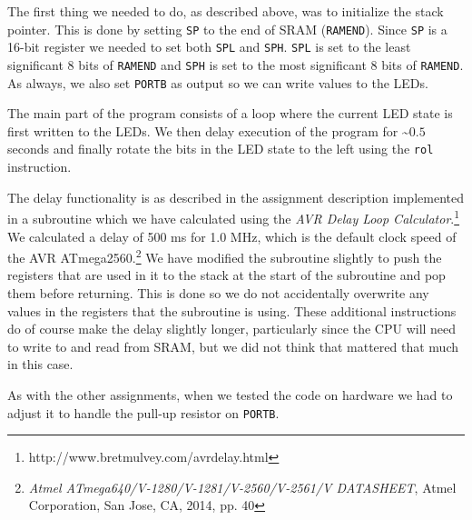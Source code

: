 The first thing we needed to do, as described above, was to initialize the stack pointer. This is done by setting \texttt{SP} to the end of SRAM (\texttt{RAMEND}). Since \texttt{SP} is a 16-bit register we needed to set both \texttt{SPL} and \texttt{SPH}. \texttt{SPL} is set to the least significant 8 bits of \texttt{RAMEND} and \texttt{SPH} is set to the most significant 8 bits of \texttt{RAMEND}. As always, we also set \texttt{PORTB} as output so we can write values to the LEDs.

The main part of the program consists of a loop where the current LED state is first written to the LEDs. We then delay execution of the program for \textasciitilde $0.5$ seconds and finally rotate the bits in the LED state to the left using the \texttt{rol} instruction. 

The delay functionality is as described in the assignment description implemented in a subroutine which we have calculated using the \emph{AVR Delay Loop Calculator}.\footnote{http://www.bretmulvey.com/avrdelay.html} We calculated a delay of 500 ms for 1.0 MHz, which is the default clock speed of the AVR ATmega2560.\footnote{\emph{Atmel ATmega640/V-1280/V-1281/V-2560/V-2561/V DATASHEET}, Atmel Corporation, San Jose, CA, 2014, pp. 40} We have modified the subroutine slightly to push the registers that are used in it to the stack at the start of the subroutine and pop them before returning. This is done so we do not accidentally overwrite any values in the registers that the subroutine is using. These additional instructions do of course make the delay slightly longer, particularly since the CPU will need to write to and read from SRAM, but we did not think that mattered that much in this case.

As with the other assignments, when we tested the code on hardware we had to adjust it to handle the pull-up resistor on \texttt{PORTB}.
